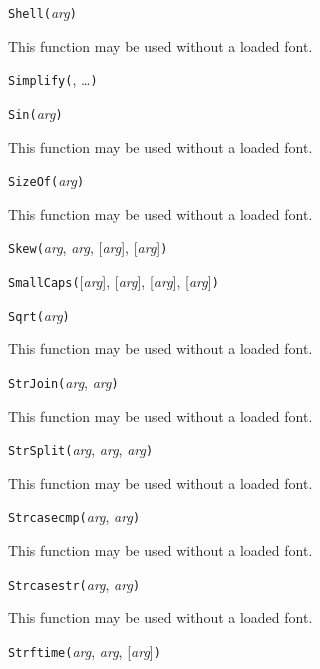 
\noindent\texttt{Shell(}\textit{arg}\texttt{)}

This function may be used without a loaded font.


\noindent\texttt{Simplify(}, \ldots\texttt{)}


\noindent\texttt{Sin(}\textit{arg}\texttt{)}

This function may be used without a loaded font.


\noindent\texttt{SizeOf(}\textit{arg}\texttt{)}

This function may be used without a loaded font.


\noindent\texttt{Skew(}\textit{arg}, \textit{arg}, [\textit{arg}], [\textit{arg}]\texttt{)}


\noindent\texttt{SmallCaps(}[\textit{arg}], [\textit{arg}], [\textit{arg}], [\textit{arg}]\texttt{)}


\noindent\texttt{Sqrt(}\textit{arg}\texttt{)}

This function may be used without a loaded font.


\noindent\texttt{StrJoin(}\textit{arg}, \textit{arg}\texttt{)}

This function may be used without a loaded font.


\noindent\texttt{StrSplit(}\textit{arg}, \textit{arg}, \textit{arg}\texttt{)}

This function may be used without a loaded font.


\noindent\texttt{Strcasecmp(}\textit{arg}, \textit{arg}\texttt{)}

This function may be used without a loaded font.


\noindent\texttt{Strcasestr(}\textit{arg}, \textit{arg}\texttt{)}

This function may be used without a loaded font.


\noindent\texttt{Strftime(}\textit{arg}, \textit{arg}, [\textit{arg}]\texttt{)}

